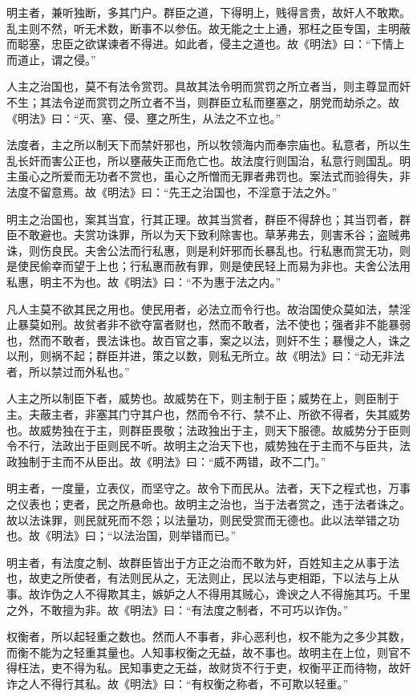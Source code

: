 \documentclass[]{article}
\begin{document}
明主者，兼听独断，多其门户。群臣之道，下得明上，贱得言贵，故奸人不敢欺。乱主则不然，听无术数，断事不以参伍。故无能之士上通，邪枉之臣专国，主明蔽而聪塞，忠臣之欲谋谏者不得进。如此者，侵主之道也。故《明法》曰：``下情上而道止，谓之侵。''

人主之治国也，莫不有法令赏罚。具故其法令明而赏罚之所立者当，则主尊显而奸不生；其法令逆而赏罚之所立者不当，则群臣立私而壅塞之，朋党而劫杀之。故《明法》曰：``灭、塞、侵、壅之所生，从法之不立也。''

法度者，主之所以制天下而禁奸邪也，所以牧领海内而奉宗庙也。私意者，所以生乱长奸而害公正也，所以壅蔽失正而危亡也。故法度行则国治，私意行则国乱。明主虽心之所爱而无功者不赏也，虽心之所憎而无罪者弗罚也。案法式而验得失，非法度不留意焉。故《明法》曰：``先王之治国也，不淫意于法之外。''

明主之治国也，案其当宜，行其正理。故其当赏者，群臣不得辞也；其当罚者，群臣不敢避也。夫赏功诛罪，所以为天下致利除害也。草茅弗去，则害禾谷；盗贼弗诛，则伤良民。夫舍公法而行私惠，则是利奸邪而长暴乱也。行私惠而赏无功，则是使民偷幸而望于上也；行私惠而赦有罪，则是使民轻上而易为非也。夫舍公法用私惠，明主不为也。故《明法》曰：``不为惠于法之内。''

凡人主莫不欲其民之用也。使民用者，必法立而令行也。故治国使众莫如法，禁淫止暴莫如刑。故贫者非不欲夺富者财也，然而不敢者，法不使也；强者非不能暴弱也，然而不敢者，畏法诛也。故百官之事，案之以法，则奸不生；暴慢之人，诛之以刑，则祸不起；群臣并进，策之以数，则私无所立。故《明法》曰：``动无非法者，所以禁过而外私也。''

人主之所以制臣下者，威势也。故威势在下，则主制于臣；威势在上，则臣制于主。夫蔽主者，非塞其门守其户也，然而令不行、禁不止、所欲不得者，失其威势也。故威势独在于主，则群臣畏敬；法政独出于主，则天下服德。故威势分于臣则令不行，法政出于臣则民不听。故明主之治天下也，威势独在于主而不与臣共，法政独制于主而不从臣出。故《明法》曰：``威不两错，政不二门。''

明主者，一度量，立表仪，而坚守之。故令下而民从。法者，天下之程式也，万事之仪表也；吏者，民之所悬命也。故明主之治也，当于法者赏之，违于法者诛之。故以法诛罪，则民就死而不怨；以法量功，则民受赏而无德也。此以法举错之功也。故《明法》曰；``以法治国，则举错而已。''

明主者，有法度之制、故群臣皆出于方正之治而不敢为奸，百姓知主之从事于法也，故吏之所使者，有法则民从之，无法则止，民以法与吏相距，下以法与上从事。故诈伪之人不得欺其主，嫉妒之人不得用其贼心，谗谀之人不得施其巧。千里之外，不敢擅为非。故《明法》曰：``有法度之制者，不可巧以诈伪。''

权衡者，所以起轻重之数也。然而人不事者，非心恶利也，权不能为之多少其数，而衡不能为之轻重其量也。人知事权衡之无益，故不事也。故明主在上位，则官不得枉法，吏不得为私。民知事吏之无益，故财货不行于吏，权衡平正而待物，故奸诈之人不得行其私。故《明法》曰：``有权衡之称者，不可欺以轻重。''
\end{document}

